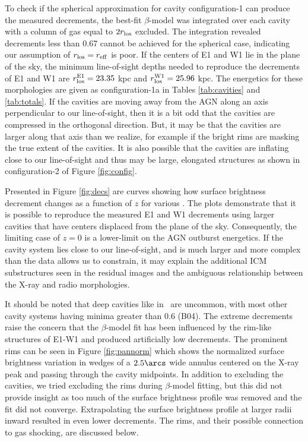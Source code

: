 \documentclass[iop]{emulateapj-rtx4}
\begin{document}
To check if the spherical approximation for cavity configuration-1 can
produce the measured decrements, the best-fit $\beta$-model was
integrated over each cavity with a column of gas equal to $2r_{\rm{los}}$
excluded. The integration revealed decrements less than 0.67 cannot be
achieved for the spherical case, indicating our assumption of $r_{\rm{los}} =
r_{\rm{eff}}$ is poor. If the centers of E1 and W1 lie in the plane of the
sky, the minimum line-of-sight depths needed to reproduce the
decrements of E1 and W1 are $r_{\rm{los}}^{\rm{E1}} = 23.35$ kpc and
$r_{\rm{los}}^{\rm{W1}} = 25.96$ kpc. The energetics for these morphologies
are given as configuration-1a in Tables \ref{tab:cavities} and
\ref{tab:totals}. If the cavities are moving away from the AGN along
an axis perpendicular to our line-of-sight, then it is a bit odd that
the cavities are compressed in the orthogonal direction. But, it may
be that the cavities are larger along that axis than we realize, for
example if the bright rims are masking the true extent of the
cavities. It is also possible that the cavities are inflating close to
our line-of-sight and thus may be large, elongated structures as shown
in configuration-2 of Figure \ref{fig:config}.

Presented in Figure \ref{fig:decs} are curves showing how surface
brightness decrement changes as a function of $z$ for various
\rlos. The plots demonstrate that it is possible to reproduce the
measured E1 and W1 decrements using larger cavities that have centers
displaced from the plane of the sky. Consequently, the limiting case
of $z = 0$ is a lower-limit on the AGN outburst energetics. If the
cavity system lies close to our line-of-sight, and is much larger and
more complex than the data allows us to constrain, it may explain the
additional ICM substructures seen in the residual images and the
ambiguous relationship between the X-ray and radio
morphologies.

It should be noted that deep cavities like in \rbs\ are uncommon, with
most other cavity systems having minima greater than 0.6 (B04). The
extreme decrements raise the concern that the $\beta$-model fit has
been influenced by the rim-like structures of E1-W1 and produced
artificially low decrements. The prominent rims can be seen in Figure
\ref{fig:pannorm} which shows the normalized surface brightness
variation in wedges of a $2.5\arcs$ wide annulus centered on the X-ray
peak and passing through the cavity midpoints. In addition to
excluding the cavities, we tried excluding the rims during
$\beta$-model fitting, but this did not provide insight as too much of
the surface brightness profile was removed and the fit did not
converge. Extrapolating the surface brightness profile at larger radii
inward resulted in even lower decrements. The rims, and their possible
connection to gas shocking, are discussed below.
\end{document}
